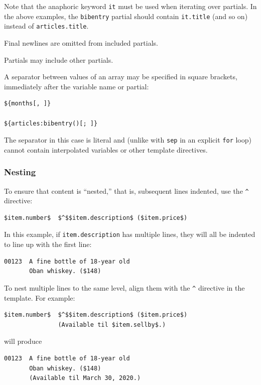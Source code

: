 \documentclass[
]{article}
\begin{document}
Note that the anaphoric keyword \texttt{it} must be used when iterating
over partials. In the above examples, the \texttt{bibentry} partial
should contain \texttt{it.title} (and so on) instead of
\texttt{articles.title}.

Final newlines are omitted from included partials.

Partials may include other partials.

A separator between values of an array may be specified in square
brackets, immediately after the variable name or partial:

\begin{verbatim}
${months[, ]}

${articles:bibentry()[; ]}
\end{verbatim}

The separator in this case is literal and (unlike with \texttt{sep} in
an explicit \texttt{for} loop) cannot contain interpolated variables or
other template directives.

\hypertarget{nesting}{%
\subsubsection{Nesting}\label{nesting}}

To ensure that content is ``nested,'' that is, subsequent lines
indented, use the \texttt{\^{}} directive:

\begin{verbatim}
$item.number$  $^$$item.description$ ($item.price$)
\end{verbatim}

In this example, if \texttt{item.description} has multiple lines, they
will all be indented to line up with the first line:

\begin{verbatim}
00123  A fine bottle of 18-year old
       Oban whiskey. ($148)
\end{verbatim}

To nest multiple lines to the same level, align them with the
\texttt{\^{}} directive in the template. For example:

\begin{verbatim}
$item.number$  $^$$item.description$ ($item.price$)
               (Available til $item.sellby$.)
\end{verbatim}

will produce

\begin{verbatim}
00123  A fine bottle of 18-year old
       Oban whiskey. ($148)
       (Available til March 30, 2020.)
\end{verbatim}
\end{document}
